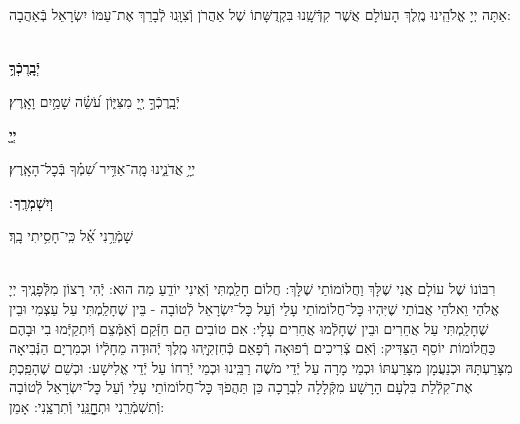 \documentclass[twoside, openany, parskip=half, 11pt]{book}
\begin{document}
אַתָּה יְיָ אֱלֹהֵֽינוּ מֶֽלֶךְ הָעוֹלָם אֲשֶׁר קִדְּֿשָֽׁנוּ בִּקְדֻשָּׁתוֹ שֶׁל אַהֲרֹן וְֿצִוָּֽנוּ לְֿבָרֵךְ אֶת־עַמּוֹ יִשְׂרָאֵל בְּֿאַהֲבָה:


\\
\textbf{יְֿבָֽרֶכְֿךָ֥}
\hfill \begin{footnotesize}
 יְֿבָֽרֶכְֿךָ֣ יְ֖יָ מִצִּיּ֑וֹן עֹ֝שֵׂ֗ה שָׁמַ֥יִם וָאָֽרֶץ׃\\
\end{footnotesize}
\textbf{יְיָ֖}
\hfill \begin{footnotesize}
 יְיָ֥ אֲדֹנֵ֑ינוּ מָֽה־אַדִּ֥יר שִׁ֝מְ֗ךָ בְּֿכׇל־הָאָֽרֶץ׃\\
\end{footnotesize}
\textbf{וְיִשְׁמְרֶֽךָ}
׃ \hfill \begin{footnotesize}
 שָׁמְֿרֵ֥נִי אֵ֝֗ל כִּֽי־חָסִ֥יתִי בָֽךְ׃
\end{footnotesize}

\\

רִבּוֹנוֹ שֶׁל עוֹלָם אֲנִי שֶׁלָּךְ וַחֲלוֹמוֹתַי שֶׁלָּךְ: חֲלוֹם חָלַֽמְתִּי וְֿאֵינִי יוֹדֵֽעַ מַה הוּא: יְֿהִי רָצוֹן מִלְּֿפָנֶֽיךָ יְיָ אֱלֹהַי וֵאלֹהֵי אֲבוֹתַי שֶׁיִּהְיוּ כׇּל־חֲלוֹמוֹתַי עָלַי וְֿעַל כׇּל־יִשְׂרָאֵל לְֿטוֹבָה - בֵּין שֶׁחָלַֽמְתִּי עַל עַצְמִי וּבֵין שֶׁחָלַֽמְתִּי עַל אֲחֵרִים וּבֵין שֶׁחָלְֿמוּ אֲחֵרִים עָלָי: אִם טוֹבִים הֵם חַזְּֿקֵם וְֿאַמְּֿצֵם וְֿיִתְקַיְּֿמוּ בִי וּבָהֶם כַּחֲלוֹמוֹת יוֹסֵף הַצַּדִּיק: וְֿאִם צְֿרִיכִים רְֿפוּאָה רְֿפָאֵם כְּֿחִזְקִיָּֽהוּ מֶֽלֶךְ יְֿהוּדָה מֵחָלְֿיוֹ וּכְמִרְיָם הַנְּֿבִיאָה מִצָּרַעְתָּהּ וּכְנַעֲמָן מִצָּרַעְתּוֹ וּכְמֵי מָרָה עַל יְֿדֵי מֹשֶׁה רַבֵּֽינוּ וּכְמֵי יְֿרִחוֹ עַל יְֿדֵי אֱלִישָׁע: וּכְשֵׁם שֶׁהָפַֽכְתָּ אֶת־קִלְֿלַת בִּלְעָם הָרָשָׁע מִקְּֿלָלָה לִבְרָכָה כֵּן תַּהֲפֹךְ כׇּל־חֲלוֹמוֹתַי עָלַי וְֿעַל כׇּל־יִשְׂרָאֵל לְֿטוֹבָה וְֿתִשְׁמְֿרֵֽנִי וּתְחׇׇׇׇׇָנֵּֽנִי וְֿתִרְצֵֽנִי: אָמֵן:
\end{document}
